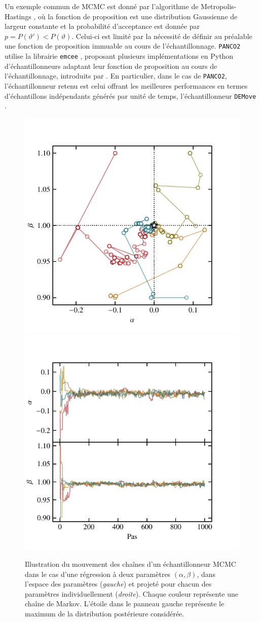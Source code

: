 Un exemple commun de MCMC est donné par l'algorithme de Metropolis-Hastings \cite{metropolis_monte_1949,hastings_monte_1970}, où la fonction de proposition est une distribution Gaussienne de largeur constante et la probabilité d'acceptance est donnée par $p = P(\vartheta') < P(\vartheta)$.
Celui-ci est limité par la nécessité de définir au préalable une fonction de proposition immuable au cours de l'échantillonnage.
\texttt{PANCO2} utilise la librairie \texttt{emcee} \cite{foreman-mackey_emcee_2019}, proposant plusieurs implémentations en Python d'échantillonneurs adaptant leur fonction de proposition au cours de l'échantillonnage, introduits par .
En particulier, dans le cas de \texttt{PANCO2}, l'échantillonneur retenu est celui offrant les meilleures performances en termes d'échantillons indépendants générés par unité de temps, l'échantillonneur \texttt{DEMove} \cite{nelson_run_2013}.

\begin{figure}[t]
    \centering
    \includegraphics[width=.495\textwidth]{Figures/Chap_panco/mcmc_params.pdf}
    \includegraphics[width=.495\textwidth]{Figures/Chap_panco/mcmc_trace.pdf}
    \caption{
        Illustration du mouvement des chaînes d'un échantillonneur MCMC dans le cas d'une régression à deux paramètres $(\alpha, \beta)$, dans l'espace des paramètres (\textit{gauche}) et projeté pour chacun des paramètres individuellement (\textit{droite}).
        Chaque couleur représente une chaîne de Markov.
        L'étoile dans le panneau gauche représente le maximum de la distribution postérieure considérée.
    }
    \label{fig:panco:mcmc}
\end{figure}

